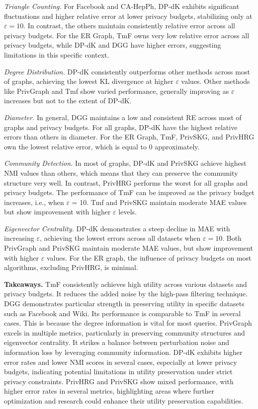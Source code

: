 \documentclass[conference]{IEEEtran}
\theoremstyle{plain}
\begin{document}
\textit{Triangle Counting.}
For Facebook and CA-HepPh, DP-dK exhibits significant fluctuations and higher relative error at lower privacy budgets, stabilizing only at $\varepsilon = 10$. 
In contrast, the others maintain consistently relative error across all privacy budgets.
For the ER Graph, TmF owns very low relative error across all privacy budgets, while DP-dK and DGG have higher errors, suggesting limitations in this specific context.

\textit{Degree Distribution.}
DP-dK consistently outperforms other methods across most of graphs, achieving the lowest KL divergence at higher $\varepsilon$ values. Other methods like PrivGraph and Tmf show varied performance, generally improving as $\varepsilon$ increases but not to the extent of DP-dK. 

\textit{Diameter.}
In general, DGG maintains a low and consistent RE across most of graphs and privacy budgets.
For all graphs, DP-dK have the highest relative errors than others in diameter. 
For the ER Graph, TmF, PrivSKG, and PrivHRG own the lowest relative error, which is equal to 0 approximately.

\textit{Community Detection.}
In most of graphs, DP-dK and PrivSKG achieve highest NMI values than others, which means that they can preserve the community structure very well.
In contrast, PrivHRG performs the worst for all graphs and privacy budgets.
The performance of TmF can be improved as the privacy budget increases, i.e., when $\varepsilon$ = 10.
Tmf and PrivSKG  maintain moderate MAE values but show improvement with higher $\varepsilon$ levels. 

\textit{Eigenvector Centrality.}
DP-dK demonstrates a steep decline in MAE with increasing $\varepsilon$, achieving the lowest errors across all datasets when $\varepsilon = 10$. 
Both PrivGraph and PrivSKG maintain moderate MAE values, but show improvement with higher $\varepsilon$ values. 
For the ER graph, the influence of privacy budgets on most algorithms, excluding PrivHRG, is minimal.

\textbf{Takeaways.} 
TmF consistently achieves high utility across various datasets and privacy budgets.
It reduces the added noise by the high-pass filtering technique.
DGG demonstrates particular strength in preserving utility in specific datasets such as Facebook and Wiki.
Its performance is comparable to TmF in several cases.
This is because the degree information is vital for most queries.
PrivGraph excels in multiple metrics, particularly in preserving community structures and eigenvector centrality.
It strikes a balance between perturbation noise and information loss by leveraging community information.
DP-dK exhibits higher error rates and lower NMI scores in several cases, especially at lower privacy budgets, indicating potential limitations in utility preservation under strict privacy constraints.
PrivHRG and PrivSKG show mixed performance, with higher error rates in several metrics, highlighting areas where further optimization and research could enhance their utility preservation capabilities.
\end{document}
